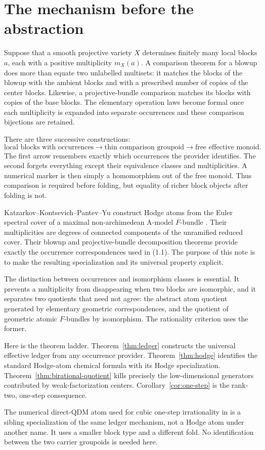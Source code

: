 \section{The mechanism before the abstraction}
\label{sec:overview}

Suppose that a smooth projective variety $X$ determines finitely many local
blocks $a$, each with a positive multiplicity $m_X(a)$.  A comparison
theorem for a blowup does more than equate two unlabelled multisets: it matches
the blocks of the blowup with the ambient blocks and with a prescribed number
of copies of the center blocks.  Likewise, a projective-bundle comparison
matches its blocks with copies of the base blocks.  The elementary operation
laws become formal once each multiplicity is expanded into separate
occurrences and these comparison bijections are retained.

There are three successive constructions:
\[
 \text{local blocks with occurrences}
 \longrightarrow \text{thin comparison groupoid}
 \longrightarrow \text{free effective monoid}.
 \tag{1.1}
\]
The first arrow remembers exactly which occurrences the provider identifies.
The second forgets everything except their equivalence classes and
multiplicities.  A numerical marker is then simply a homomorphism out of the
free monoid.  Thus comparison is required before folding, but equality of
richer block objects after folding is not.

Katzarkov--Kontsevich--Pantev--Yu construct Hodge atoms from the Euler
spectral cover of a maximal non-archimedean A-model $F$-bundle
\cite[Sections~5.2--5.4]{KKPY}.  Their multiplicities are degrees of connected
components of the unramified reduced cover.  Their blowup and
projective-bundle decomposition theorems provide exactly the occurrence
correspondences used in (1.1).  The purpose of this note is to make the
resulting specialization and its universal property explicit.

The distinction between occurrences and isomorphism classes is essential.
It prevents a multiplicity from disappearing when two blocks are isomorphic,
and it separates two quotients that need not agree: the abstract atom quotient
generated by elementary geometric correspondences, and the quotient of
geometric atomic $F$-bundles by isomorphism.  The rationality criterion uses
the former.

Here is the theorem ladder.  Theorem~\ref{thm:ledger} constructs the universal
effective ledger from any occurrence provider.  Theorem~\ref{thm:hodge}
identifies the standard Hodge-atom chemical formula with its Hodge
specialization.  Theorem~\ref{thm:birational-quotient} kills precisely the
low-dimensional generators contributed by weak-factorization centers.
Corollary~\ref{cor:one-step} is the rank-two, one-step consequence.

The numerical direct-QDM atom used for cubic one-step irrationality in
\cite{Epilogue} is a sibling specialization of the same ledger mechanism,
not a Hodge atom under another name.  It uses a smaller block type and a
different fold.  No identification between the two carrier groupoids is
needed here.
